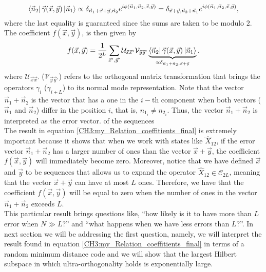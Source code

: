 \begin{equation}
\mathinner{\langle{\vec{n}_2}|}\vec{\gamma}(\vec{x},\vec{y})\mathinner{|{\vec{n}_1}\rangle}\propto \delta_{\vec{n}_1+\vec{x}+\vec{y},\vec{n}_2}e^{i\phi(\vec{n}_1,\vec{n}_2,\vec{x},\vec{y})} = \delta_{\vec{x}+\vec{y},\vec{n}_2+\vec{n}_1}e^{i\phi(\vec{n}_1,\vec{n}_2,\vec{x},\vec{y})},
\end{equation} 
where the last equality is guaranteed since the sums are taken to be modulo $2$.\\
\indent The coefficient $f(\vec{x},\vec{y})$, is then given by
\begin{equation}
f(\vec{x},\vec{y}) = \frac{1}{2^L}\sum_{\vec{x}',\vec{y}'} \mathcal{U}_{\vec{x}\vec{x}'} \mathcal{V}_{\vec{y}\vec{y}'} \underbrace{\mathinner{\langle{\vec{n}_2}|}\vec{\gamma}(\vec{x},\vec{y})\mathinner{|{\vec{n}_1}\rangle}}_{\propto \delta_{\vec{n}_1+\vec{n}_2,\vec{x}+\vec{y}}}.
\label{CH3:my_Relation_coeffitients_final}
\end{equation}
where $\mathcal{U}_{\vec{x}\vec{x}'}$ ($\mathcal{V}_{\vec{y}\vec{y}'}$) refers to the orthogonal matrix transformation that brings the operators $\gamma_{i}$ ($\gamma_{i+L}$) to its normal mode representation. Note that the vector $\vec{n}_1+\vec{n}_2$ is the vector that has a one in the $i-$th component when both vectors ($\vec{n}_1$ and $\vec{n}_2$) differ in the position $i$, that is, $n_{1_i}\neq n_{2_i}$. Thus, the vector $\vec{n}_1+\vec{n}_2$ is interpreted as the error vector. of the sequences\\

\indent The result in equation \eqref{CH3:my_Relation_coeffitients_final} is extremely important because it shows that when we work with states like $\hat{X}_{12}$, if the error vector $\vec{n}_1+\vec{n}_2$ has a larger number of ones than the vector $\vec{x}+\vec{y}$, the coefficient $f(\vec{x},\vec{y})$ will immediately become zero. Moreover, notice that we have defined $\vec{x}$ and $\vec{y}$ to be sequences that allows us to expand the operator $\hat{X}_{12}\in\mathcal{C}_{2L}$, meaning that the vector $\vec{x}+\vec{y}$ can have at most $L$ ones. Therefore, we have that the coefficient $f(\vec{x},\vec{y})$ will be equal to zero when the number of ones in the vector $\vec{n}_1+\vec{n}_2$ exceeds $L$.\\
\indent This particular result brings questions like, ``how likely is it to have more than $L$ error when $N\gg L$?'' and ``what happens when we have less errors than $L$?''. In next section we will be addressing the first question, namely, we will interpret the result found in equation \eqref{CH3:my_Relation_coeffitients_final} in terms of a random minimum distance code and we will show that the largest Hilbert subspace in which ultra-orthogonality holds is exponentially large.
